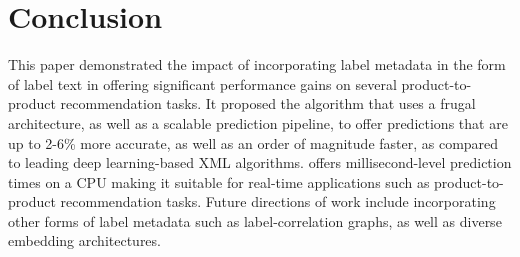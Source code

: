 \section{Conclusion}
\label{sec:conc}
This paper demonstrated the impact of incorporating label metadata in the form of label text in offering significant performance gains on several product-to-product recommendation tasks. It proposed the \alg algorithm that uses a frugal architecture, as well as a scalable prediction pipeline, to offer predictions that are up to 2-6\% more accurate, as well as an order of magnitude faster, as compared to leading deep learning-based XML algorithms. \alg offers millisecond-level prediction times on a CPU making it suitable for real-time applications such as product-to-product recommendation tasks. Future directions of work include incorporating other forms of label metadata such as label-correlation graphs, as well as diverse embedding architectures.